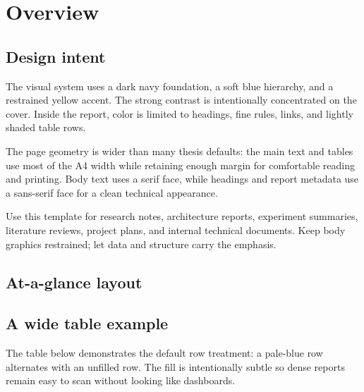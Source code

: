\chapter{Overview}

\section{Design intent}
The visual system uses a dark navy foundation, a soft blue hierarchy, and a restrained yellow accent. The strong contrast is intentionally concentrated on the cover. Inside the report, color is limited to headings, fine rules, links, and lightly shaded table rows.

The page geometry is wider than many thesis defaults: the main text and tables use most of the A4 width while retaining enough margin for comfortable reading and printing. Body text uses a serif face, while headings and report metadata use a sans-serif face for a clean technical appearance.

\begin{insightbox}
Use this template for research notes, architecture reports, experiment summaries, literature reviews, project plans, and internal technical documents. Keep body graphics restrained; let data and structure carry the emphasis.
\end{insightbox}

\section{At-a-glance layout}
\hfill
{}
\hfill
{}

\section{A wide table example}
The table below demonstrates the default row treatment: a pale-blue row alternates with an unfilled row. The fill is intentionally subtle so dense reports remain easy to scan without looking like dashboards.

